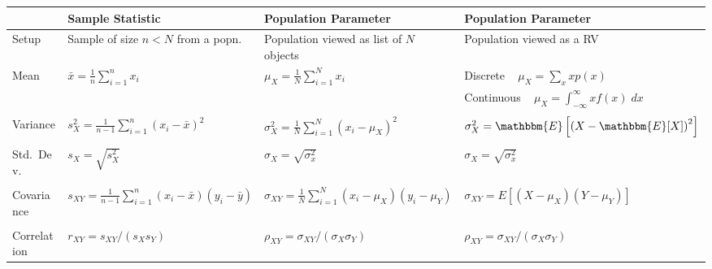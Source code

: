 \documentclass[12pt]{article}
\begin{document}
\begin{sidewaystable}
\centering
\begin{tabular}{l|l|l|l}
&Sample Statistic & Population Parameter & Population Parameter\\
\hline
Setup & Sample of size $n < N$ from a popn.\ &  Population viewed as list of $N$ objects& Population viewed as a RV\\
Mean &$\bar{x} = \displaystyle\frac{1}{n}\sum_{i=1}^n x_i$&$\displaystyle \mu_X = \frac{1}{N}\sum_{i=1}^N x_i$&Discrete $\;\;\; \displaystyle \mu_X = \sum_{x}xp(x)$\\
&&&Continuous $\;\;\; \mu_X = \int_{-\infty}^\infty xf(x)\; dx$\\
&&&\\
Variance &$\displaystyle s_X^2 = \frac{1}{n-1} \sum_{i=1}^n (x_i - \bar{x})^2$&$\displaystyle \sigma_X^2 = \frac{1}{N} \sum_{i=1}^N (x_i - \mu_X)^2$& $\sigma^2_X = \mathbbm{E}\left[\left(X - \mathbbm{E}[X]\right)^2 \right]$\\
&&&\\
Std.\ Dev.\ &$s_X = \sqrt{s^2_X}$&$\sigma_X = \sqrt{\sigma^2_x}$&$\sigma_X = \sqrt{\sigma^2_x}$\\
&&&\\
Covariance &$\displaystyle s_{XY} = \frac{1}{n-1} \sum_{i=1}^n (x_i -\bar{x})(y_i - \bar{y})$&$\sigma_{XY} = \displaystyle \frac{1}{N} \sum_{i=1}^N (x_i -\mu_X)(y_i - \mu_Y)$&$\sigma_{XY} = E\left[ \left(X - \mu_X \right) \left(Y - \mu_Y \right)  \right]$ \\
&&&\\
Correlation &$r_{XY} = s_{XY}/(s_X s_Y)$&$\rho_{XY} = \sigma_{XY}/(\sigma_X \sigma_Y)$& $\rho_{XY} = \sigma_{XY}/(\sigma_X \sigma_Y)$\\
\hline
\end{tabular}

\end{sidewaystable}
\end{document}

